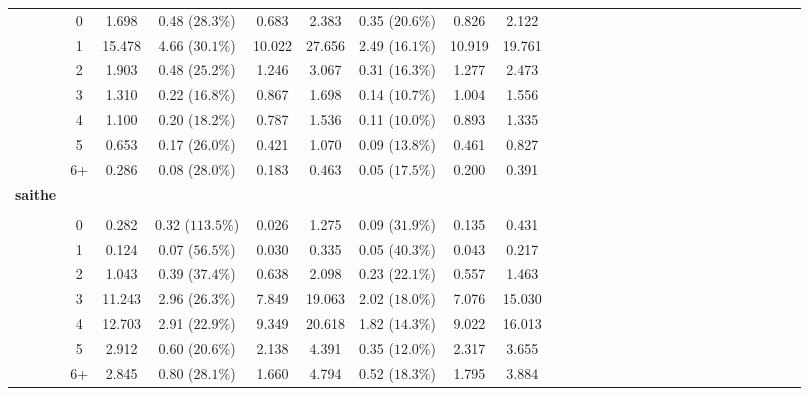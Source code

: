 \documentclass[a4paper 12pt]{article}
\numberwithin{equation}{section}
\begin{document}
\begin{tiny}
\begin{table}[h!]
\begin{tabular}{ccccccccccccccccccccccccccc}
\raisebox{1.5ex}{2017 Q3}& 0   & 1.698  & 0.48 ($28.3 \%$) & 0.683 & 2.383  & 0.35 ($20.6 \%$) &0.826 & 2.122 \\[1ex]
& 1  & 15.478& 4.66 ($30.1 \%$) & 10.022 & 27.656 & 2.49 ($16.1 \%$) &10.919 & 19.761  \\[1ex]
& 2  & 1.903 & 0.48 ($25.2 \%$) & 1.246  & 3.067  & 0.31 ($16.3 \%$) &1.277 &2.473  \\[1ex]
& 3  & 1.310 & 0.22 ($16.8 \%$) & 0.867  & 1.698  & 0.14 ($10.7 \%$)  &1.004 &1.556  \\[1ex]
& 4  &1.100  & 0.20 ($18.2 \%$) & 0.787  & 1.536  & 0.11 ($10.0 \%$)  &0.893 &1.335  \\[1ex]
& 5  & 0.653 & 0.17 ($26.0 \%$) & 0.421  & 1.070  & 0.09 ($13.8 \%$) &0.461 &0.827  \\[1ex]
& 6+ & 0.286 & 0.08 ($28.0 \%$) & 0.183  & 0.463  & 0.05 ($17.5 \%$)  &0.200 &0.391 \\[3.5ex]


{\bf saithe} \\[1.0ex]
\cmidrule(lr{0.1em}){1-1}\\[1.0ex]

\raisebox{1.5ex}{2017 Q3} & 0& 0.282 &0.32 ($113.5 \%$) & 0.026 & 1.275   &0.09 ($31.9 \%$) &0.135 &0.431 \\[1ex]
& 1  & 0.124  & 0.07 ($56.5 \%$) &0.030  & 0.335  &0.05  ($40.3 \%$) &0.043  &0.217  \\[1ex]
& 2  & 1.043  & 0.39 ($37.4 \%$) &0.638  & 2.098  &0.23  ($22.1 \%$) &0.557  &1.463 \\[1ex]
& 3  & 11.243 & 2.96 ($26.3 \%$) &7.849  & 19.063 &2.02  ($18.0 \%$) &7.076  &15.030  \\[1ex]
& 4  & 12.703 & 2.91 ($22.9 \%$) &9.349  & 20.618 &1.82  ($14.3 \%$) &9.022  &16.013  \\[1ex]
& 5  & 2.912  & 0.60 ($20.6 \%$) &2.138  & 4.391  &0.35  ($12.0 \%$) &2.317  &3.655 \\[1ex]
& 6+ & 2.845  & 0.80 ($28.1 \%$) &1.660  & 4.794  &0.52  ($18.3 \%$) &1.795  &3.884 \\[0.5ex]
\hline
\end{tabular}
\end{table}
\end{tiny}



\end{document}
